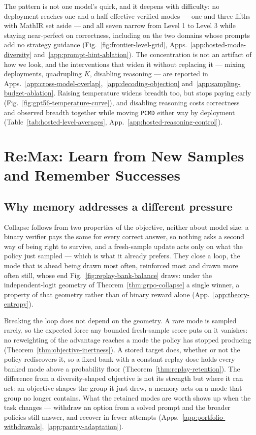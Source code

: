 \documentclass{article}
\newcommand{\1}{\mathbf 1}
\newcommand{\pmd}{\texttt{PCMD}}
\theoremstyle{remark}
\theoremstyle{definition}
\theoremstyle{plain}
\begin{document}
The pattern is not one model's quirk, and it deepens with difficulty: no
deployment reaches one and a half effective verified modes --- one and three
fifths with MathIR set aside --- and all seven narrow
from Level 1 to Level 3 while staying near-perfect on correctness, including on
the two domains whose prompts add no strategy guidance
(Fig.~\ref{fig:frontier-level-grid}, Apps.~\ref{app:hosted-mode-diversity}
and~\ref{app:prompt-hint-ablation}). The concentration is not an artifact of
how we look, and the interventions that widen it without replacing it ---
mixing deployments, quadrupling $K$, disabling reasoning --- are reported in
Apps.~\ref{app:cross-model-overlap},~\ref{app:decoding-objection}
and~\ref{app:sampling-budget-ablation}. Raising temperature widens breadth too,
but stops paying early (Fig.~\ref{fig:gpt56-temperature-curve}), and disabling
reasoning costs correctness and observed breadth together while moving \pmd{}
either way by deployment (Table~\ref{tab:hosted-level-averages},
App.~\ref{app:hosted-reasoning-control}).

\section{Re:Max: Learn from New Samples and Remember Successes}
\label{sec:method}

\subsection{Why memory addresses a different pressure}
\label{sec:collapse-mechanism}

Collapse follows from two properties of the objective, neither about model
size: a binary verifier pays the same for every correct answer, so nothing asks
a second way of being right to survive, and a fresh-sample update acts only on
what the policy just sampled --- which is what it already prefers. They close a
loop, the mode that is ahead being drawn most often, reinforced most and drawn
more often still, whose end Fig.~\ref{fig:replay-bank-balance} draws: under the
independent-logit geometry of Theorem~\ref{thm:grpo-collapse} a single winner,
a property of that geometry rather than of binary reward alone
(App.~\ref{app:theory-entropy}).

Breaking the loop does not depend on the geometry. A rare mode is sampled
rarely, so the expected force any bounded fresh-sample score puts on it
vanishes: no reweighting of the advantage reaches a mode the policy has stopped
producing (Theorem~\ref{thm:objective-inertness}). A stored target does,
whether or not the policy rediscovers it, so a fixed bank with a constant
replay dose holds every banked mode above a probability floor
(Theorem~\ref{thm:replay-retention}). The difference from a diversity-shaped
objective is not its strength but where it can act: an objective shapes the
group it just drew, a memory acts on a mode that group no longer contains. What
the retained modes are worth shows up when the task changes --- withdraw an
option from a solved prompt and the broader policies still answer, and recover
in fewer attempts
(Apps.~\ref{app:portfolio-withdrawals},~\ref{app:pantry-adaptation}).
\end{document}
